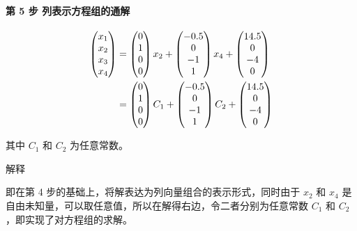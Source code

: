 \paragraph{第 5 步  列表示方程组的通解}

$$
\begin{aligned}
\begin{pmatrix} x_1 \\ x_2 \\ x_3 \\ x_4 \end{pmatrix} &=
\begin{pmatrix} 0 \\ 1 \\ 0 \\ 0 \end{pmatrix} x_2+
\begin{pmatrix} -0.5 \\ 0 \\ -1 \\ 1 \end{pmatrix} x_4 +
\begin{pmatrix} 14.5 \\ 0 \\ -4 \\ 0 \end{pmatrix} \notag \\
&= \begin{pmatrix} 0 \\ 1 \\ 0 \\ 0 \end{pmatrix} C_1+
\begin{pmatrix} -0.5 \\ 0 \\ -1 \\ 1 \end{pmatrix} C_2 +
\begin{pmatrix} 14.5 \\ 0 \\ -4 \\ 0 \end{pmatrix} \notag
\end{aligned}
$$

其中 $C_1$ 和 $C_2$ 为任意常数。

解释

\begin{QUOTE}{}{}
即在第 4 步的基础上，将解表达为列向量组合的表示形式，同时由于 $x_2$ 和 $x_4$ 是自由未知量，可以取任意值，所以在解得右边，令二者分别为任意常数 $C_1$ 和 $C_2$，即实现了对方程组的求解。
\end{QUOTE}

